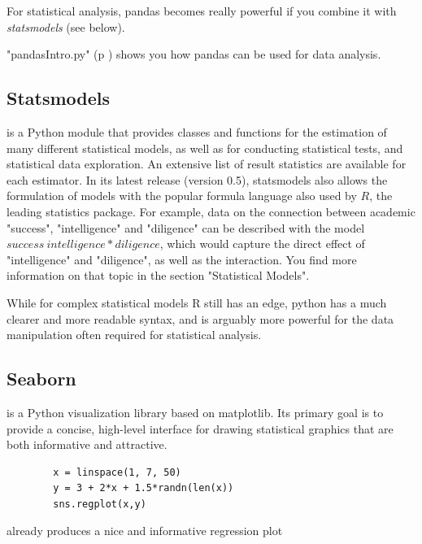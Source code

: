 For statistical analysis, pandas becomes really powerful if you combine it with \emph{statsmodels} (see below).

\PyImg "pandasIntro.py" (p \pageref{py:pandasIntro}) shows you how pandas can be used for data analysis.

\subsection{Statsmodels}

\cite{statsmodels} is a Python module that provides classes and functions for the estimation of many different statistical models, as well as for conducting statistical tests, and statistical data exploration. An extensive list of result statistics are available for each estimator. In its latest release (version 0.5), statsmodels also allows the formulation of models with the popular formula language also used by $R$, the leading statistics package. For example, data on the connection between academic "success", "intelligence" and "diligence" can be described with the model $success ~ intelligence * diligence$, which would capture the direct effect of "intelligence" and "diligence", as well as the interaction. You find more information on that topic in the section "Statistical Models".

While for complex statistical models R still has an edge, python has a much clearer and more readable syntax, and is arguably more powerful for the data manipulation often required for statistical analysis.

\subsection{Seaborn}

\cite{seaborn} is a Python visualization library based on matplotlib. Its primary goal is to provide a concise, high-level interface for drawing statistical graphics that are both informative and attractive.

\begin{lstlisting}
        x = linspace(1, 7, 50)
        y = 3 + 2*x + 1.5*randn(len(x))
        sns.regplot(x,y)
\end{lstlisting}

already produces a nice and informative regression plot

